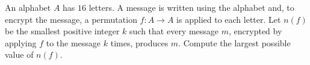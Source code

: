 An alphabet $A$ has $16$ letters. A message is written using the alphabet and, to encrypt the message, a permutation $f : A \to A$ is applied to each letter. Let $n(f)$ be the smallest positive integer $k$ such that every message $m$, encrypted by applying $f$ to the message $k$ times, produces $m$. Compute the largest possible value of $n(f)$.